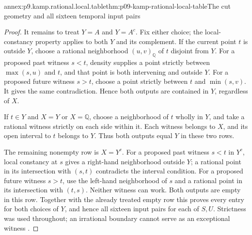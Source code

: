 \begin{annexitem}{annex:p9.kamp.rational.local.table}{thm:p09-kamp-rational-local-table}{The cut geometry and all sixteen temporal input pairs}
\begin{proof}
It remains to treat \(Y=A\) and \(Y=A^c\). Fix
either choice; the local-constancy property applies to
both \(Y\) and its complement. If the current point
\(t\) is outside \(Y\), choose a rational
neighborhood \((u,v)_{\mathbb Q}\) of \(t\)
disjoint from \(Y\). For a proposed past witness
\(s<t\), density supplies a point strictly between
\(\max(s,u)\) and \(t\), and that point is both
intervening and outside \(Y\). For a proposed future
witness \(s>t\), choose a point strictly between
\(t\) and \(\min(s,v)\). It gives the same
contradiction. Hence both outputs are contained in
\(Y\), regardless of \(X\).

If \(t\in Y\) and \(X=Y\) or
\(X=\mathbb Q\), choose a neighborhood of \(t\)
wholly in \(Y\), and take a rational witness strictly
on each side within it. Each witness belongs to
\(X\), and its open interval to \(t\) belongs
to \(Y\). Thus both outputs equal \(Y\) in
these two rows.

The remaining nonempty row is \(X=Y^c\). For a
proposed past witness \(s<t\) in \(Y^c\), local
constancy at \(s\) gives a right-hand neighborhood
outside \(Y\); a rational point in its intersection
with \((s,t)\) contradicts the interval condition.
For a proposed future witness \(s>t\), use the
left-hand neighborhood of \(s\) and a rational point
in its intersection with \((t,s)\). Neither witness
can work. Both outputs are empty in this row. Together
with the already treated empty row this proves every
entry for both choices of \(Y\), and hence all
sixteen input pairs for each of \(S,U\). Strictness
was used throughout; an irrational boundary cannot
serve as an exceptional witness
\cite[ch.~IV, thm.~5 construction and induction,
       pp.~109--112]{Kamp1968}.
\end{proof}
\end{annexitem}

